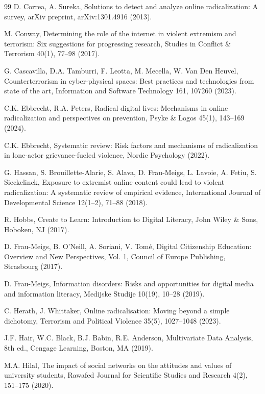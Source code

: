 \documentclass[10pt]{NSP1}
\begin{document}
\begin{thebibliography}{99}
D. Correa, A. Sureka, Solutions to detect and analyze online radicalization: A survey, arXiv preprint, arXiv:1301.4916 (2013).

M. Conway, Determining the role of the internet in violent extremism and terrorism: Six suggestions for progressing research, Studies in Conflict \& Terrorism 40(1), 77–98 (2017).

G. Cascavilla, D.A. Tamburri, F. Leotta, M. Mecella, W. Van Den Heuvel, Counterterrorism in cyber-physical spaces: Best practices and technologies from state of the art, Information and Software Technology 161, 107260 (2023).

C.K. Ebbrecht, R.A. Peters, Radical digital lives: Mechanisms in online radicalization and perspectives on prevention, Psyke \& Logos 45(1), 143–169 (2024).

C.K. Ebbrecht, Systematic review: Risk factors and mechanisms of radicalization in lone-actor grievance-fueled violence, Nordic Psychology (2022).

G. Hassan, S. Brouillette-Alarie, S. Alava, D. Frau-Meigs, L. Lavoie, A. Fetiu, S. Sieckelinck, Exposure to extremist online content could lead to violent radicalization: A systematic review of empirical evidence, International Journal of Developmental Science 12(1–2), 71–88 (2018).

R. Hobbs, Create to Learn: Introduction to Digital Literacy, John Wiley \& Sons, Hoboken, NJ (2017).

D. Frau-Meigs, B. O'Neill, A. Soriani, V. Tomé, Digital Citizenship Education: Overview and New Perspectives, Vol. 1, Council of Europe Publishing, Strasbourg (2017).

D. Frau-Meigs, Information disorders: Risks and opportunities for digital media and information literacy, Medijske Studije 10(19), 10–28 (2019).

C. Herath, J. Whittaker, Online radicalisation: Moving beyond a simple dichotomy, Terrorism and Political Violence 35(5), 1027–1048 (2023).

J.F. Hair, W.C. Black, B.J. Babin, R.E. Anderson, Multivariate Data Analysis, 8th ed., Cengage Learning, Boston, MA (2019).

M.A. Hilal, The impact of social networks on the attitudes and values of university students, Rawafed Journal for Scientific Studies and Research 4(2), 151–175 (2020).


\end{thebibliography}
\end{document}
